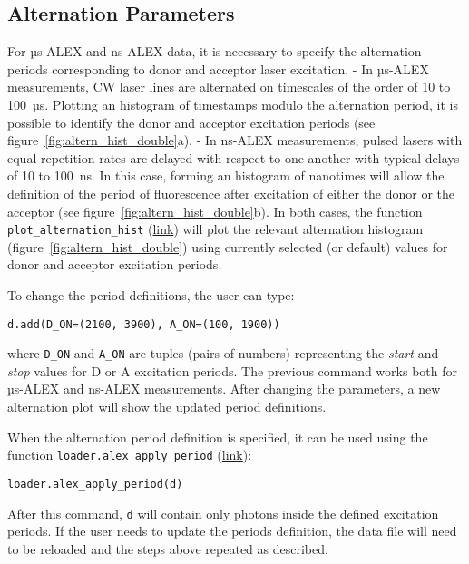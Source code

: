 \subsection{Alternation Parameters}
\label{sec:alternation}

For µs-ALEX and ns-ALEX data, it is necessary to specify the
alternation periods corresponding to donor and acceptor laser excitation.
- In µs-ALEX measurements,
CW laser lines are alternated on timescales of the order of 10 to 100~µs.
Plotting an histogram of timestamps modulo the alternation period, it
is possible to identify the donor and acceptor excitation periods (see figure~\ref{fig:altern_hist_double}a).
- In ns-ALEX measurements,
 pulsed lasers with equal repetition rates are delayed with respect to one another with typical delays of 10 to 100~ns.
In this case, forming an histogram of nanotimes
will allow 
the definition of the period of fluorescence after excitation of either the donor or the acceptor
(see figure~\ref{fig:altern_hist_double}b).
In both cases, the function
\verb|plot_alternation_hist| 
(\href{http://fretbursts.readthedocs.org/en/latest/plots.html#fretbursts.burst_plot.plot_alternation_hist}{link})
will plot the relevant alternation histogram (figure~\ref{fig:altern_hist_double}) 
using currently selected (or default) values for donor and acceptor excitation periods.

To change the period definitions, the user can type:

\begin{lstlisting}
d.add(D_ON=(2100, 3900), A_ON=(100, 1900))
\end{lstlisting}

where \verb|D_ON| and \verb|A_ON| are tuples (pairs of numbers) representing
the \textit{start} and \textit{stop} values for D or A excitation periods.
The previous command works both for µs-ALEX and ns-ALEX measurements.
After changing the parameters, a new alternation plot will show the updated 
period definitions.

When the alternation period definition is specified, it can
be used using the function \verb|loader.alex_apply_period|
(\href{http://fretbursts.readthedocs.org/en/latest/loader.html#fretbursts.loader.alex_apply_period}{link}):

\begin{lstlisting}
loader.alex_apply_period(d)
\end{lstlisting}

After this command, \verb|d| will contain only photons inside the defined excitation periods.
If the user needs to update the periods definition, the data file will need to be reloaded and the steps above repeated as described.
